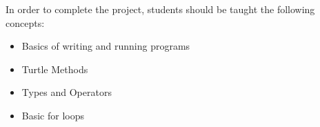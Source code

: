 \documentclass[11pt, letterpaper, onecolumn, oneside, final]{article}
\begin{document}
In order to complete the project, students should be taught the following concepts:
\begin{itemize}
    \item Basics of writing and running programs
    \item Turtle Methods
    \item Types and Operators
    \item Basic for loops
\end{itemize}
\end{document}
